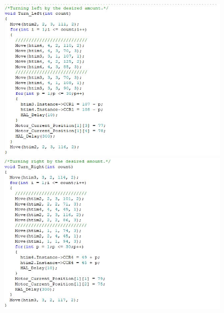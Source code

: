	\begin{figure}[!h]
	\centering
	\includegraphics[width=\columnwidth]{./Images/Appendix/IMG_13.JPG}
	
	\vspace{0.5cm}
	\includegraphics[width=\columnwidth]{./Images/Appendix/IMG_14.JPG}
	\end{figure}	
	
